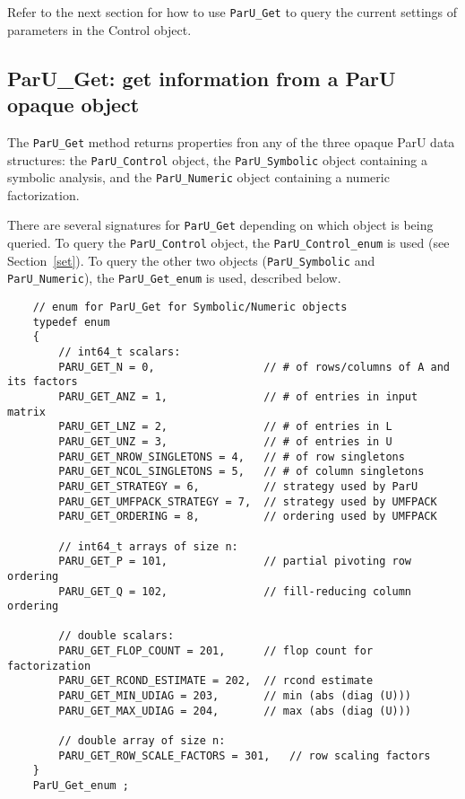 \documentclass[12pt]{article}
\begin{document}
Refer to the next section for how to use \verb'ParU_Get' to query
the current settings of parameters in the Control object.

\subsection{{\sf ParU\_Get}: get information from a ParU opaque object}
\label{get}

The \verb'ParU_Get' method returns properties fron any of the three opaque ParU
data structures: the \verb'ParU_Control' object, the \verb'ParU_Symbolic'
object containing a symbolic analysis, and the \verb'ParU_Numeric' object
containing a numeric factorization.

There are several signatures for \verb'ParU_Get' depending on which
object is being queried.  To query the \verb'ParU_Control' object,
the \verb'ParU_Control_enum' is used (see Section~\ref{set}).  To query the
other two objects (\verb'ParU_Symbolic' and  \verb'ParU_Numeric'), the
\verb'ParU_Get_enum' is used, described below.

    {\footnotesize
    \begin{verbatim}
    // enum for ParU_Get for Symbolic/Numeric objects
    typedef enum
    {
        // int64_t scalars:
        PARU_GET_N = 0,                 // # of rows/columns of A and its factors
        PARU_GET_ANZ = 1,               // # of entries in input matrix
        PARU_GET_LNZ = 2,               // # of entries in L
        PARU_GET_UNZ = 3,               // # of entries in U
        PARU_GET_NROW_SINGLETONS = 4,   // # of row singletons
        PARU_GET_NCOL_SINGLETONS = 5,   // # of column singletons
        PARU_GET_STRATEGY = 6,          // strategy used by ParU
        PARU_GET_UMFPACK_STRATEGY = 7,  // strategy used by UMFPACK
        PARU_GET_ORDERING = 8,          // ordering used by UMFPACK

        // int64_t arrays of size n:
        PARU_GET_P = 101,               // partial pivoting row ordering
        PARU_GET_Q = 102,               // fill-reducing column ordering

        // double scalars:
        PARU_GET_FLOP_COUNT = 201,      // flop count for factorization
        PARU_GET_RCOND_ESTIMATE = 202,  // rcond estimate
        PARU_GET_MIN_UDIAG = 203,       // min (abs (diag (U)))
        PARU_GET_MAX_UDIAG = 204,       // max (abs (diag (U)))

        // double array of size n:
        PARU_GET_ROW_SCALE_FACTORS = 301,   // row scaling factors
    }
    ParU_Get_enum ; \end{verbatim}}
\end{document}
